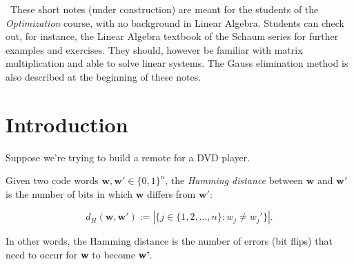 \maketitle

\
These short notes  (under construction) are meant for the students of the  {\em Optimization} course, with no background in Linear Algebra. Students can check out, for instance, the Linear Algebra textbook of the Schaum series for further examples and exercises. They should, however be familiar with matrix multiplication and  able to solve linear systems.  The  Gauss elimination method is also  described at the beginning of these notes.


\section{Introduction}
Suppose we're trying to build a remote for a DVD player.


\begin{definition}
Given two code words $\textbf{w}, \textbf{w}' \in \{0,1\}^n$, the \emph{Hamming distance} between $\textbf{w}$ and $\textbf{w}'$ is the number of bits in which $\textbf{w}$ differs from $\textbf{w}'$:

\begin{equation}
    d_H(\textbf{w}, \textbf{w}') := |\{j \in \{1, 2, \ldots, n\} : w_j \neq w_j'\}|.
\end{equation}
\end{definition}
In other words, the Hamming distance is the number of errors (bit flips) that need to occur for \textbf{w} to become \textbf{w'}.

